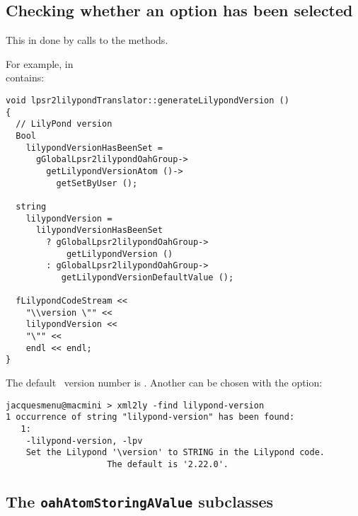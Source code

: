 \subsection{Checking whether an option has been selected}

This in done by calls to the  methods.

For example,  in \\
 contains:
\begin{lstlisting}[language=CPlusPlus]
void lpsr2lilypondTranslator::generateLilypondVersion ()
{
  // LilyPond version
  Bool
    lilypondVersionHasBeenSet =
      gGlobalLpsr2lilypondOahGroup->
        getLilypondVersionAtom ()->
          getSetByUser ();

  string
    lilypondVersion =
      lilypondVersionHasBeenSet
        ? gGlobalLpsr2lilypondOahGroup->
            getLilypondVersion ()
        : gGlobalLpsr2lilypondOahGroup->
           getLilypondVersionDefaultValue ();

  fLilypondCodeStream <<
    "\\version \"" <<
    lilypondVersion <<
    "\"" <<
    endl << endl;
}
\end{lstlisting}

The default \lily\ version number is . Another can be chosen with the  option:
\begin{lstlisting}[language=Terminal]
jacquesmenu@macmini > xml2ly -find lilypond-version
1 occurrence of string "lilypond-version" has been found:
   1:
    -lilypond-version, -lpv
    Set the Lilypond '\version' to STRING in the Lilypond code.
                    The default is '2.22.0'.
\end{lstlisting}


\subsection{The {\tt oahAtomStoringAValue} subclasses}

